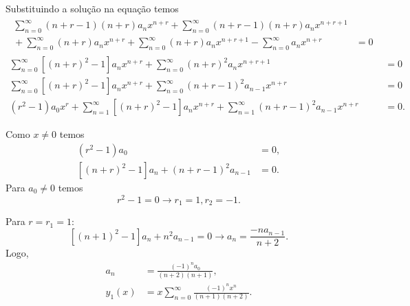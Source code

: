 \documentclass[a4paper,12pt, leqno, answers]{exam}
\begin{document}
\begin{questions}
\begin{solution}
        Substituindo a solu\c{c}\~{a}o na equa\c{c}\~{a}o temos
        \begin{align*}
            \begin{split}
                \sum_{n = 0}^\infty \left( n + r - 1 \right) \left( n + r \right) a_n x^{n + r} + \sum_{n = 0}^\infty \left( n + r - 1 \right) \left( n + r \right) a_n x^{n + r + 1} \\ {}+ \sum_{n = 0}^\infty \left( n + r \right) a_n x^{n + r} + \sum_{n = 0}^\infty \left( n + r \right) a_n x^{n + r + 1} - \sum_{n = 0}^\infty a_n x^{n + r} &= 0
            \end{split} \\
            \sum_{n = 0}^\infty \left[ \left( n + r \right)^2 - 1 \right] a_n x^{n + r} + \sum_{n = 0}^\infty \left( n + r \right)^2 a_n x^{n + r + 1} &= 0 \\
            \sum_{n = 0}^\infty \left[ \left( n + r \right)^2 - 1 \right] a_n x^{n + r} + \sum_{n = 0}^\infty \left( n + r - 1 \right)^2 a_{n - 1} x^{n + r} &= 0 \\
                \left( r^2 - 1 \right) a_0 x^r + \sum_{n = 1}^\infty \left[ \left( n + r \right)^2 - 1 \right] a_n x^{n + r} + \sum_{n = 1}^\infty \left( n + r - 1 \right)^2 a_{n - 1} x^{n + r} &= 0.
        \end{align*}

        Como $x \neq 0$ temos
        \begin{align*}
            \left( r^2 - 1 \right) a_0 &= 0, \\
            \left[ \left( n + r \right)^2 - 1 \right] a_n + \left( n + r - 1 \right)^2 a_{n - 1} &= 0.
        \end{align*}
        Para $a_0 \neq 0$ temos
        \[
        r^2 - 1 = 0 \rightarrow r_1 = 1, r_2 = -1.
        \]

        Para $r = r_1 = 1$:
        \[
        \left[ \left( n + 1 \right)^2 - 1 \right] a_n + n^2 a_{n - 1} = 0 \rightarrow a_n = \frac{- n a_{n - 1}}{n + 2}.
        \]
        Logo,
        \begin{align*}
            a_n &= \frac{\left( -1 \right)^n a_0}{\left( n + 2 \right) \left( n + 1 \right)}, \\
            y_1(x) &= x \sum_{n = 0}^\infty \frac{\left( -1 \right)^n x^n}{\left( n + 1 \right) \left( n + 2 \right)}.
        \end{align*}


\end{solution}
\end{questions}
\end{document}
